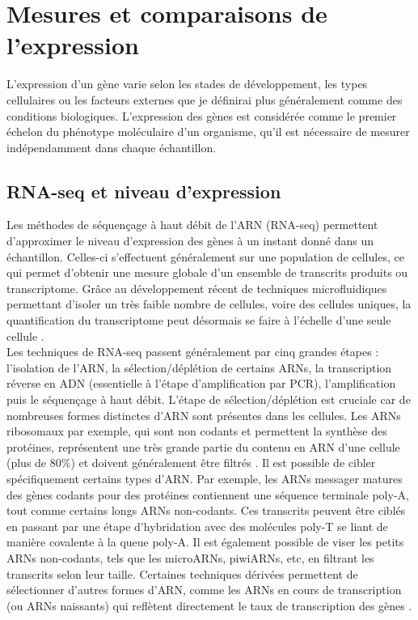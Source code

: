 \section{Mesures et comparaisons de l’expression}
\label{sec:mesure-et-comparaison}

L’expression d’un gène varie selon les stades de développement, les types cellulaires ou les facteurs externes que je définirai plus généralement comme des \glspl{condition} biologiques. L’expression des gènes est considérée comme le premier échelon du phénotype moléculaire d’un organisme, qu’il est nécessaire de mesurer indépendamment dans chaque échantillon.

\subsection{RNA-seq et niveau d’expression}
\label{subsec:RNAseq-niveau-expression}
Les méthodes de séquençage à haut débit de l’\acrshort{ARN} (\acrshort{RNA-seq}) permettent d’approximer le niveau d’expression des gènes à un instant donné dans un échantillon. Celles-ci s’effectuent généralement sur une population de cellules, ce qui permet d’obtenir une mesure globale d’un ensemble de transcrits produits ou \gls{transcriptome}. Grâce au développement récent de techniques microfluidiques permettant d’isoler un très faible nombre de cellules, voire des cellules uniques, la quantification du \gls{transcriptome} peut désormais se faire à l’échelle d’une seule cellule \citep{tang_mrna-seq_2009}. 
 \\

Les techniques de \acrshort{RNA-seq} passent généralement par cinq grandes étapes : l’isolation de l’\acrshort{ARN}, la sélection/déplétion de certains \acrshort{ARN}s, la transcription réverse en \acrshort{ADN} (essentielle à l’étape d’amplification par PCR), l’amplification puis le séquençage à haut débit. L’étape de sélection/déplétion est cruciale car de nombreuses formes distinctes d’\acrshort{ARN} sont présentes dans les cellules. Les \acrshort{ARN}s ribosomaux par exemple, qui sont non codants et permettent la synthèse des protéines, représentent une très grande partie du contenu en \acrshort{ARN} d’une cellule (plus de 80\%) et doivent généralement être filtrés \citep{oneil_ribosomal_2013}. Il est possible de cibler spécifiquement certains types d'\acrshort{ARN}. Par exemple, les \acrshort{ARN}s messager matures des gènes codants pour des protéines contiennent une séquence terminale poly-A, tout comme certains longs \acrshort{ARN}s non-codants. Ces transcrits peuvent être ciblés en passant par une étape d'hybridation avec des molécules poly-T se liant de manière covalente à la queue poly-A. Il est également possible de viser les petits \acrshort{ARN}s non-codants, tels que les micro\acrshort{ARN}s, piwi\acrshort{ARN}s, etc, en filtrant les transcrits selon leur taille. Certaines techniques dérivées permettent de sélectionner d’autres formes d’\acrshort{ARN}, comme les \acrshort{ARN}s en cours de transcription (ou \acrshort{ARN}s naissants) qui reflètent directement le taux de transcription des gènes \citep{core_nascent_2008}. 

